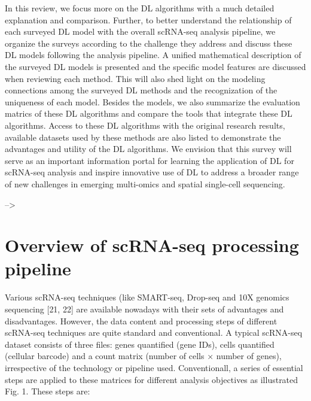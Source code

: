\documentclass[
]{book}
\begin{document}
In this review, we focus more on the DL algorithms with a much detailed explanation and comparison. Further, to better understand the relationship of each surveyed DL model with the overall scRNA-seq analysis pipeline, we organize the surveys according to the challenge they address and discuss these DL models following the analysis pipeline. A unified mathematical description of the surveyed DL models is presented and the specific model features are discussed when reviewing each method. This will also shed light on the modeling connections among the surveyed DL methods and the recognization of the uniqueness of each model. Besides the models, we also summarize the evaluation matrics of these DL algorithms and compare the tools that integrate these DL algorithms. Access to these DL algorithms with the original research results, available datasets used by these methods are also listed to demonstrate the advantages and utility of the DL algorithms. We envision that this survey will serve as an important information portal for learning the application of DL for scRNA-seq analysis and inspire innovative use of DL to address a broader range of new challenges in emerging multi-omics and spatial single-cell sequencing.

--\textgreater{}

\hypertarget{ch-2}{%
\chapter{Overview of scRNA-seq processing pipeline}\label{ch-2}}

Various scRNA-seq techniques (like SMART-seq, Drop-seq and 10X genomics sequencing {[}21, 22{]} are available nowadays with their sets of advantages and disadvantages. However, the data content and processing steps of different scRNA-seq techniques are quite standard and conventional. A typical scRNA-seq dataset consists of three files: genes quantified (gene IDs), cells quantified (cellular barcode) and a count matrix (number of cells × number of genes), irrespective of the technology or pipeline used. Conventionall, a series of essential steps are applied to these matrices for different analysis objectives as illustrated Fig. 1. These steps are:
\end{document}
